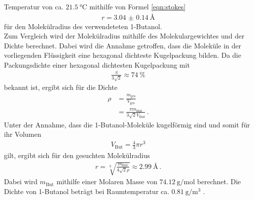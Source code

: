 Temperatur von ca. $\SI{21.5}{\degreeCelsius}$
mithilfe von Formel \eqref{eqn:stokes}
\begin{align}
  r = \SI{3.04(014)}{\angstrom}
  \label{eqn:radius1}
\end{align}
für den Molekülradius des verwendeteten 1-Butanol. \\
Zum Vergleich wird der Molekülradius mithilfe des Molekulargewichtes und der Dichte berechnet. Dabei wird die Annahme getroffen,
dass die Moleküle in der vorliegenden Flüssigkeit eine hexagonal dichteste Kugelpackung bilden.
Da die Packungsdichte einer hexagonal dichtesten Kugelpackung mit
\begin{align*}
  \frac{\pi}{3\sqrt{2}} \approx \SI{74}{\percent}
\end{align*}
bekannt ist, ergibt sich für die Dichte
\begin{align*}
  \rho &= \frac{m_\text{ges}}{V_\text{ges}} \\
       &= \frac{\pi m_\text{But}}{3\sqrt{2}V_\text{But}}\,.
\end{align*}
Unter der Annahme, dass die 1-Butanol-Moleküle kugelförmig sind und somit für ihr Volumen
\begin{align*}
  V_\text{But} = \frac{4}{3} \pi r^3
\end{align*}
gilt, ergibt sich für den gesuchten Molekülradius
\begin{align}
  r = \sqrt[3]{\frac{m_\text{But}}{4\sqrt{2}\rho}} \approx \SI{2.99}{\angstrom}\, .
  \label{eqn:radius2}
\end{align}
Dabei wird $m_\text{But}$ mithilfe einer Molaren Masse von $\SI{74.12}{\gram\per\mole}$ berechnet.
Die Dichte von 1-Butanol beträgt bei Raumtemperatur ca. $\SI{0.81}{\gram\per\cubic\meter}$ \cite{dichte}.
